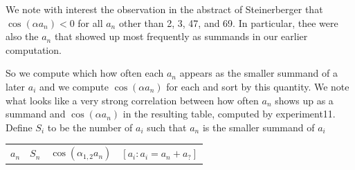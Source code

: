 \documentclass{article}
\theoremstyle{definition}
\theoremstyle{remark}
\numberwithin{equation}{section}
\begin{document}
{We note with interest the observation in the abstract of Steinerberger
that $\cos(\alpha a_n) < 0$ for all $a_n$ other than 2, 3, 47, and 69.  In
particular, thee were also the $a_n$ that showed up most frequently as
summands in our earlier computation.

So we compute which how often each $a_n$ appears as the smaller
summand of a later $a_i$ and we compute $\cos(\alpha a_n)$ for each
and sort by this quantity.  We note what looks like a very strong
correlation between how often $a_n$ shows up as a summand and
$\cos(\alpha a_n)$ in the resulting table, computed by experiment11.
Define $S_i$ to be the number of $a_i$ such that $a_n$ is the smaller
summand of $a_i$

\begin{tabular}{llll}
$a_n$ & $S_n$ & $\cos(\alpha_{1,2}  a_n)$ & $[a_i : a_i = a_n + a_?]$\\


\end{tabular}}
\end{document}
